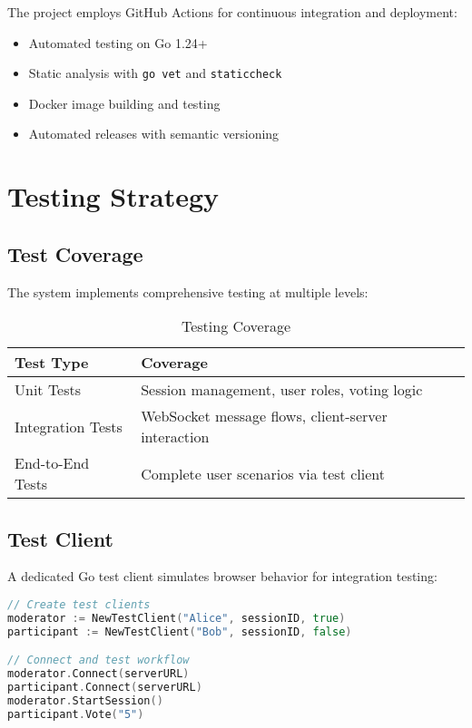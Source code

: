 \documentclass[11pt,a4paper]{article}
\begin{document}
The project employs GitHub Actions for continuous integration and deployment:

\begin{itemize}
    \item Automated testing on Go 1.24+
    \item Static analysis with \texttt{go vet} and \texttt{staticcheck}
    \item Docker image building and testing
    \item Automated releases with semantic versioning
\end{itemize}

\section{Testing Strategy}

\subsection{Test Coverage}

The system implements comprehensive testing at multiple levels:

\begin{table}[H]
\centering
\begin{tabular}{@{}lp{8cm}@{}}
\toprule
\textbf{Test Type} & \textbf{Coverage} \\
\midrule
Unit Tests & Session management, user roles, voting logic \\
Integration Tests & WebSocket message flows, client-server interaction \\
End-to-End Tests & Complete user scenarios via test client \\
\bottomrule
\end{tabular}
\caption{Testing Coverage}
\label{tab:test-coverage}
\end{table}

\subsection{Test Client}

A dedicated Go test client simulates browser behavior for integration testing:

\begin{lstlisting}[language=go, caption=Test Client Usage]
// Create test clients
moderator := NewTestClient("Alice", sessionID, true)
participant := NewTestClient("Bob", sessionID, false)

// Connect and test workflow
moderator.Connect(serverURL)
participant.Connect(serverURL)
moderator.StartSession()
participant.Vote("5")
\end{lstlisting}
\end{document}
